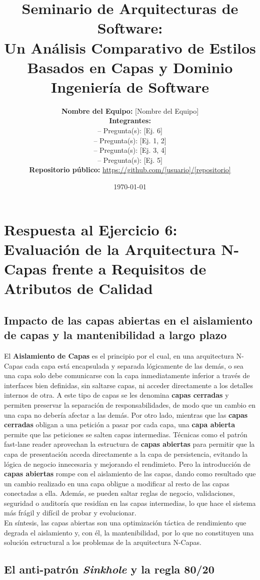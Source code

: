\documentclass[12pt,a4paper]{article}
\title{
    \vspace{-2cm}
    \textbf{Seminario de Arquitecturas de Software:}\\
    \textbf{Un Análisis Comparativo de Estilos Basados en Capas y Dominio}\\[1cm]
    \large Ingeniería de Software
}
\author{
    \textbf{Nombre del Equipo:} [Nombre del Equipo]\\[0.5cm]
    \textbf{Integrantes:}\\
    [Nombre completo 1] -- Pregunta(s): [Ej. 6]\\
    [Nombre completo 2] -- Pregunta(s): [Ej. 1, 2]\\
    [Nombre completo 3] -- Pregunta(s): [Ej. 3, 4]\\
    [Nombre completo 4] -- Pregunta(s): [Ej. 5]\\[0.5cm]
    \textbf{Repositorio público:} \url{https://github.com/[usuario]/[repositorio]}
}
\date{\today}
\begin{document}
\thispagestyle{empty}
\newpage

\section{Respuesta al Ejercicio 6: Evaluación de la Arquitectura N-Capas frente a Requisitos de Atributos de Calidad}

\subsection{Impacto de las capas abiertas en el aislamiento de capas y la mantenibilidad a largo plazo}

El \textbf{Aislamiento de Capas} es el principio por el cual, en una arquitectura N-Capas cada capa está encapsulada y separada lógicamente de las demás, o sea una capa solo debe comunicarse con la capa inmediatamente inferior a través de interfaces bien definidas, sin saltarse capas, ni acceder directamente a los detalles internos de otra. A este tipo de capas se les denomina \textbf{capas cerradas} y permiten preservar la separación de responsabilidades, de modo que un cambio en una capa no debería afectar a las demás. Por otro lado, mientras que las \textbf{capas cerradas} obligan a una petición a pasar por cada capa, una \textbf{capa abierta} permite que las peticiones se salten capas intermedias. Técnicas como el patrón fast-lane reader aprovechan la estructura de \textbf{capas abiertas} para permitir que la capa de presentación acceda directamente a la capa de persistencia, evitando la lógica de negocio innecesaria y mejorando el rendimieto. Pero la introducción de \textbf{capas abiertas} rompe con el aislamiento de las capas, dando como resultado que un cambio realizado en una capa obligue a modificar al resto de las capas conectadas a ella. Además, se pueden saltar reglas de negocio, validaciones, seguridad o auditoría que residían en las capas intermedias, lo que hace el sistema más frágil y difícil de probar y evolucionar. \\
En síntesis, las capas abiertas son una optimización táctica de rendimiento que degrada el aislamiento y, con él, la mantenibilidad, por lo que no constituyen una solución estructural a los problemas de la arquitectura N-Capas.
\subsection{El anti-patrón \textit{Sinkhole} y la regla 80/20}
\end{document}
